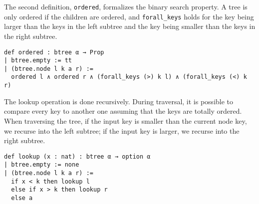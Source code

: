 The second definition, \lstinline{ordered}, formalizes the binary search property. A tree is only ordered if the children are ordered, and \lstinline{forall_keys} holds for the key being larger than the keys in the left subtree and the key being smaller than the keys in the right subtree.

\begin{lstlisting}
def ordered : btree α → Prop
| btree.empty := tt
| (btree.node l k a r) :=
  ordered l ∧ ordered r ∧ (forall_keys (>) k l) ∧ (forall_keys (<) k r)
\end{lstlisting}

The lookup operation is done recursively. During traversal, it is possible to compare every key to another one assuming that the keys are totally ordered. When traversing the tree, if the input key is smaller than the current node key, we recurse into the left subtree; if the input key is larger, we recurse into the right subtree. 

\begin{lstlisting}
def lookup (x : nat) : btree α → option α
| btree.empty := none
| (btree.node l k a r) :=
  if x < k then lookup l
  else if x > k then lookup r
  else a
\end{lstlisting}